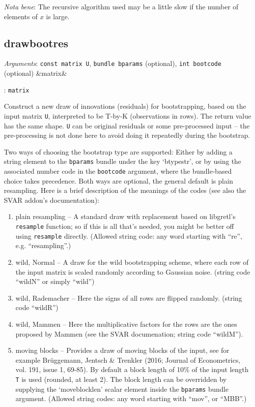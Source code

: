 \documentclass[11pt,english]{article}
\newcommand{\ArgRet}[2]{%
  {\it Arguments}: {#1}%
  \ifx&#2&%
  \else
  \par\smallskip\noindent {\it Return type}: \texttt{#2}
  \fi%
  \par\medskip\par%
  }
\begin{document}
\emph{Nota bene}: The recursive algorithm used may be a little slow if
the number of elements of $x$ is large.

\subsection{drawbootres}

\ArgRet{\texttt{const matrix U}, \texttt{bundle bparams} (optional),
  \texttt{int bootcode} (optional)}{matrix} Construct a new draw of
innovations (residuals) for bootstrapping, based on the input matrix
\texttt{U}, interpreted to be T-by-K (observations in rows). The
return value has the same shape. \texttt{U} can be original residuals
or some pre-processed input -- the pre-processing is not done here to
avoid doing it repeatedly during the bootstrap.

Two ways of choosing the bootstrap type are supported: Either by
adding a string element to the \texttt{bparams} bundle under the key
`btypestr', or by using the associated number code in the
\texttt{bootcode} argument, where the bundle-based choice takes
precedence. Both ways are optional, the general default is plain
resampling. Here is a brief description of the meanings of the codes
(see also the SVAR addon's documentation):

\begin{enumerate}
\item plain resampling -- A standard draw with replacement based on
  libgretl's \texttt{resample} function; so if this is all that's
  needed, you might be better off using \texttt{resample}
  directly. (Allowed string code: any word starting with ``re'',
  e.g. ``resampling''.)
\item wild, Normal -- A draw for the wild bootstrapping scheme, where
  each row of the input matrix is scaled randomly according to
  Gaussian noise.  (string code ``wildN'' or simply ``wild'')
\item wild, Rademacher -- Here the signs of all rows are flipped
  randomly.  (string code ``wildR'')
\item wild, Mammen -- Here the multiplicative factors for the rows are
  the ones proposed by Mammen (see the SVAR documenation; string code
  ``wildM'').
\item moving blocks -- Provides a draw of moving blocks of the input,
  see for example Brüggemann, Jentsch \& Trenkler (2016; Journal of
  Econometrics, vol. 191, issue 1, 69-85). By default a block length
  of 10\% of the input length \texttt{T} is used (rounded, at least
  2). The block length can be overridden by supplying the
  `moveblocklen' scalar element inside the \texttt{bparams} bundle
  argument. (Allowed string codes: any word starting with ``mov'', or
  ``MBB''.)

\end{enumerate}
\end{document}
